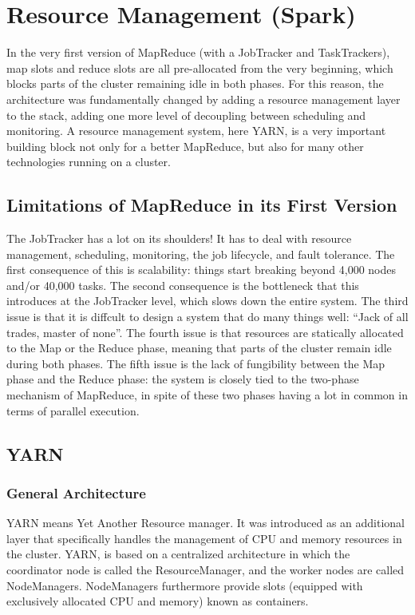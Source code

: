 \section{Resource Management (Spark)}
In the very first version of MapReduce (with a JobTracker and TaskTrackers), map slots and reduce slots are all pre-allocated from the very beginning, which blocks parts of the cluster remaining idle in both phases. For this reason, the architecture was fundamentally changed by adding a resource management layer to the stack, adding one more level of decoupling between scheduling and monitoring. A resource management system, here YARN, is a very important building block not only for a better MapReduce, but also for many other technologies running on a cluster.

\subsection{Limitations of MapReduce in its First Version}
The JobTracker has a lot on its shoulders! It has to deal with resource management, scheduling, monitoring, the job lifecycle, and fault tolerance.
The first consequence of this is scalability: things start breaking beyond 4,000 nodes and/or 40,000 tasks.
The second consequence is the bottleneck that this introduces at the JobTracker level, which slows down the entire system.
The third issue is that it is diffcult to design a system that do many things well: “Jack of all trades, master of none”.
The fourth issue is that resources are statically allocated to the Map or the Reduce phase, meaning that parts of the cluster remain idle during both phases.
The fifth issue is the lack of fungibility between the Map phase and the Reduce phase: the system is closely tied to the two-phase mechanism of MapReduce, in spite of these two phases having a lot in common in terms of parallel execution.

\subsection{YARN}

\subsubsection{General Architecture}

YARN means Yet Another Resource manager. It was introduced as an additional layer that specifically handles the management of CPU and memory resources in the cluster.
YARN, is based on a centralized architecture in which the coordinator node is called the ResourceManager, and the worker nodes are called NodeManagers. NodeManagers furthermore provide slots (equipped with exclusively allocated CPU and memory) known as containers.

